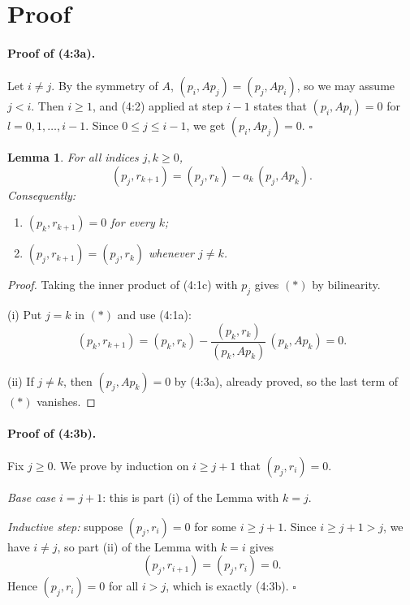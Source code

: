 \documentclass[11pt]{article}
\newtheorem*{lemma}{Lemma}
\begin{document}
\section*{Proof}

\paragraph{Proof of (4:3a).}
Let $i \neq j$. By the symmetry of $A$, $(p_i, Ap_j) = (p_j, Ap_i)$, so we may assume
$j < i$. Then $i \ge 1$, and (4:2) applied at step $i-1$ states that
$(p_i, Ap_l) = 0$ for $l = 0, 1, \dots, i-1$. Since $0 \le j \le i-1$, we get
$(p_i, Ap_j) = 0$. \hfill$\square$

\begin{lemma}
For all indices $j, k \ge 0$,
\begin{equation}
(p_j, r_{k+1}) = (p_j, r_k) - a_k\,(p_j, Ap_k). \tag{$\ast$}
\end{equation}
Consequently:
\begin{enumerate}
\item[\textup{(i)}] $(p_k, r_{k+1}) = 0$ for every $k$;
\item[\textup{(ii)}] $(p_j, r_{k+1}) = (p_j, r_k)$ whenever $j \neq k$.
\end{enumerate}
\end{lemma}

\begin{proof}
Taking the inner product of (4:1c) with $p_j$ gives $(\ast)$ by bilinearity.

(i) Put $j = k$ in $(\ast)$ and use (4:1a):
\[
(p_k, r_{k+1}) = (p_k, r_k) - \frac{(p_k, r_k)}{(p_k, Ap_k)}\,(p_k, Ap_k) = 0.
\]

(ii) If $j \neq k$, then $(p_j, Ap_k) = 0$ by (4:3a), already proved, so the last term of $(\ast)$ vanishes.
\end{proof}

\paragraph{Proof of (4:3b).}
Fix $j \ge 0$. We prove by induction on $i \ge j+1$ that $(p_j, r_i) = 0$.

\emph{Base case} $i = j+1$: this is part (i) of the Lemma with $k = j$.

\emph{Inductive step:} suppose $(p_j, r_i) = 0$ for some $i \ge j+1$. Since
$i \ge j+1 > j$, we have $i \neq j$, so part (ii) of the Lemma with $k = i$ gives
\[
(p_j, r_{i+1}) = (p_j, r_i) = 0.
\]
Hence $(p_j, r_i) = 0$ for all $i > j$, which is exactly (4:3b). \hfill$\square$
\end{document}
